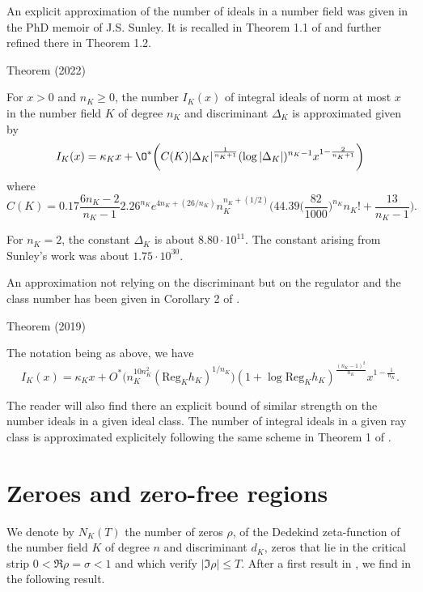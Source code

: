 An explicit approximation of the number of ideals in a number field
was given in the PhD memoir
\cite{Sunley*73}
of J.S. Sunley. It is recalled in Theorem 1.1 of
\cite{Lee*22}
and further refined there in Theorem 1.2.
\par 
\begin{thm}{Theorem (2022)}

    For $x > 0$ and $n_K\ge 0$, the number $I_K(x)$ of integral ideals
    of norm at most $x$ in the
    number field $K$ of degree $n_K$ and discriminant $\Delta_K$ is approximated given by
    $$
    I_K(x)
    =\kappa_K x
    +\O^*\biggl(C(K)|\Delta_K|^{\frac{1}{n_K+1}}(\log|\Delta_K|)^{n_K-1}
    x^{1-\frac{2}{n_K+1}}\biggr)
    $$
    where
    $$
    C(K)=0.17\frac{6n_K-2}{n_K-1}
    2.26^{n_K} e^{4n_K+(26/n_K)}n_K^{n_K+(1/2)}
    \biggl(
    44.39\biggl(\frac{82}{1000}\biggr)^{n_K}n_K!
    +
    \frac{13}{n_K-1}
    \biggr).
    $$


For $n_K=2$, the constant $\Delta_K$ is about $8.80\cdot 10^{11}$. The
constant arising from Sunley's work was about $1.75\cdot 10^{30}$.

An approximation not relying on the discriminant but on the regulator
and the class number has been given in Corollary 2 of
\cite{Debaene*19}.
\par 
Theorem (2019)


  The notation being as above, we have
  $$
  I_K(x)=\kappa_K x
  +O^*\biggl(n_K^{10n_K^2}
  (\text{Reg}_Kh_K)^{1/n_K}\biggr)
  (1+\log\text{Reg}_Kh_K)^{\frac{(n_K-1)^2}{n_K}}
  x^{1-\frac{1}{n_K}}.
  $$
\end{thm}

The reader will also find there an explicit bound of similar strength
on the number ideals in a given ideal class. 
The number of integral ideals in a given ray class is approximated
explicitely following the same scheme in Theorem 1 of
\cite{Gun-Ramare-Sivaraman*22b}.

\section{Zeroes and zero-free regions }


We denote by $N_K(T)$ the number of zeros $\rho$, of the Dedekind
zeta-function of the number field $K$ of degree $n$ and discriminant
$d_K$,
zeros that lie in the critical strip
$0 < \Re \rho = \sigma < 1$ and which verify $|\Im \rho|\le T$.
After a first result in
\cite{Kadiri-Ng*12},
we find in
\cite{Trudgian*14-1}
the following result.

